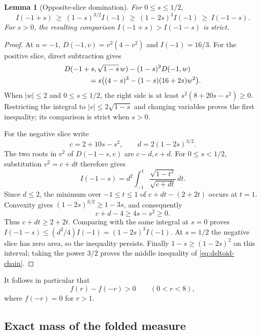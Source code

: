 \documentclass[11pt,a4paper]{article}
\newtheorem{lemma}[theorem]{Lemma}
\theoremstyle{remark}\newtheorem{remark}[theorem]{Remark}
\numberwithin{equation}{section}
\begin{document}
\begin{lemma}[Opposite-slice domination]\label{lem:deltoid-domination}
For $0\le s\le1/2$,
\begin{equation}\label{eq:deltoid-chain}
 I(-1+s)\ \ge\ (1-s)^{3/2}I(-1)
 \ \ge\ (1-2s)^3I(-1)\ \ge\ I(-1-s).
\end{equation}
For $s>0$, the resulting comparison $I(-1+s)>I(-1-s)$ is strict.
\end{lemma}
\begin{proof}
At $u=-1$, $D(-1,v)=v^2(4-v^2)$ and $I(-1)=16/3$.
For the positive slice, direct subtraction gives
\begin{align*}
 &D(-1+s,\sqrt{1-s}\,w)-(1-s)^2D(-1,w)\\
 &\hspace{12mm}=s\bigl((4-s)^3-(1-s)(16+2s)w^2\bigr).
\end{align*}
When $|w|\le2$ and $0\le s\le1/2$, the right side is at least
$s^2(8+20s-s^2)\ge0$. Restricting the integral to
$|v|\le2\sqrt{1-s}$ and changing variables proves the first inequality;
its comparison is strict when $s>0$.

For the negative slice write
\[
 c=2+10s-s^2,\qquad d=2(1-2s)^{3/2}.
\]
The two roots in $v^2$ of $D(-1-s,v)$ are $c-d,c+d$.
For $0\le s<1/2$, substitution $v^2=c+dt$ therefore gives
\[
 I(-1-s)=d^2\int_{-1}^1\frac{\sqrt{1-t^2}}{\sqrt{c+dt}}\,dt.
\]
Since $d\le2$, the minimum over $-1\le t\le1$ of
$c+dt-(2+2t)$ occurs at $t=1$. Convexity gives
$(1-2s)^{3/2}\ge1-3s$, and consequently
\[
 c+d-4\ge4s-s^2\ge0.
\]
Thus $c+dt\ge2+2t$. Comparing with the same integral at $s=0$
proves $I(-1-s)\le(d^2/4)I(-1)=(1-2s)^3I(-1)$.
At $s=1/2$ the negative slice has zero area, so the inequality persists.
Finally $1-s\ge(1-2s)^2$ on this interval; taking the power $3/2$
proves the middle inequality of \eqref{eq:deltoid-chain}.
\end{proof}

It follows in particular that
\begin{equation}\label{eq:fold-positive}
 f(r)-f(-r)>0\qquad(0<r<8),
\end{equation}
where $f(-r)=0$ for $r>1$.

\subsection{Exact mass of the folded measure}
\end{document}
